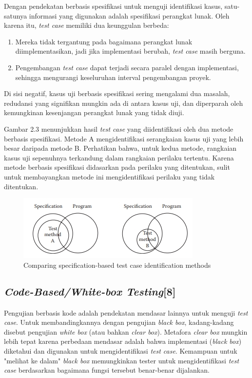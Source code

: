 Dengan pendekatan berbasis spesifikasi untuk menguji identifikasi kasus, satu-satunya informasi yang digunakan adalah spesifikasi perangkat lunak. Oleh karena itu, \textit{test case} memiliki dua keunggulan berbeda: 
\begin{enumerate}
\item Mereka tidak tergantung pada bagaimana perangkat lunak diimplementasikan, jadi jika implementasi berubah, \textit{test case} masih berguna.
\item Pengembangan \textit{test case} dapat terjadi secara paralel dengan implementasi, sehingga mengurangi keseluruhan interval pengembangan proyek.
\end{enumerate} 
Di sisi negatif, kasus uji berbasis spesifikasi sering mengalami dua masalah, redudansi yang signifikan mungkin ada di antara kasus uji, dan diperparah oleh kemungkinan kesenjangan perangkat lunak yang tidak diuji.

Gambar 2.3 menunjukkan hasil \textit{test case} yang diidentifikasi oleh dua metode berbasis spesifikasi. Metode A mengidentifikasi serangkaian kasus uji yang lebih besar daripada metode B. Perhatikan bahwa, untuk kedua metode, rangkaian kasus uji sepenuhnya terkandung dalam rangkaian perilaku tertentu. Karena metode berbasis spesifikasi didasarkan pada perilaku yang ditentukan, sulit untuk membayangkan metode ini mengidentifikasi perilaku yang tidak ditentukan.
\begin{figure}
	\includegraphics[scale=1.2]{gambar/compareAB}
	\centering
	\caption{Comparing specification-based test case identification methods}
\end{figure}
\subsection{\textit{Code-Based/White-box Testing}[8]}
\paragraph{}
Pengujian berbasis kode adalah pendekatan mendasar lainnya untuk menguji \textit{test case}. Untuk membandingkannya dengan pengujian \textit{black box}, kadang-kadang disebut pengujian \textit{white box} (atau bahkan \textit{clear box}). Metafora \textit{clear box} mungkin lebih tepat karena perbedaan mendasar adalah bahwa implementasi (\textit{black box}) diketahui dan digunakan untuk mengidentifikasi \textit{test case}. Kemampuan untuk "melihat ke dalam" \textit{black box} memungkinkan tester untuk mengidentifikasi \textit{test case} berdasarkan bagaimana fungsi tersebut benar-benar dijalankan.

